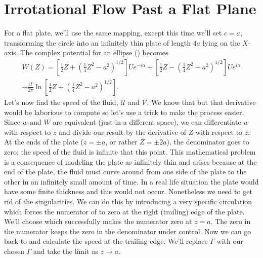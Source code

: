 \documentclass[12pt]{book}
\begin{document}
\section{Irrotational Flow Past a Flat Plane}

For a flat plate, we'll use the same mapping, except this time we'll set $c=a$, transforming the circle into an infinitely thin plate of length $4a$ lying on the $X$-axis. The complex potential for an ellipse () becomes
\begin{equation}
\begin{split}
W(Z) = \left[\tfrac{1}{2}Z + \left(\tfrac{1}{4}Z^2 - a^2\right)^{1/2}\right]Ue^{-i\alpha} + \left[\tfrac{1}{2}Z - \left(\tfrac{1}{4}Z^2 - a^2\right)^{1/2}\right]Ue^{i\alpha}\\ - \frac{i\Gamma}{2\pi}\ln\left[\tfrac{1}{2}Z + \left(\tfrac{1}{4}Z^2 - a^2\right)^{1/2}\right].
\end{split}
\label{biiiigjowkowskiflatplate}
\end{equation}
Let's now find the speed of the fluid, $\mathcal U$ and $\mathcal V$.  We know that 
but that derivative would be laborious to compute so let's use a trick to make the process easier.  Since $w$ and $W$ are equivalent (just in a different space), we can differentiate $w$ with respect to $z$ and divide our result by the derivative of $Z$ with respect to $z$:
At the ends of the plate ($z=\pm a$, or rather $Z=\pm 2a$), the denominator goes to zero; the speed of the fluid is infinite that this point.  This mathematical problem is a consequence of modeling the plate as infinitely thin and arises because at the end of the plate, the fluid must curve around from one side of the plate to the other in an infinitely small amount of time. In a real life situation the plate would have some finite thickness and this would not occur. Nonetheless we need to get rid of the singularities. We can do this by introducing a very specific circulation which forces the numerator of  to zero at the right (trailing) edge of the plate. We'll choose
which successfully makes the numerator zero at $z=a$.  The zero in the numerator keeps the zero in the denominator under control. Now we can go back to  and calculate the speed at the trailing edge. We'll replace $\Gamma$ with our chosen $\Gamma$ and take the limit as $z\to a$.
\end{document}
